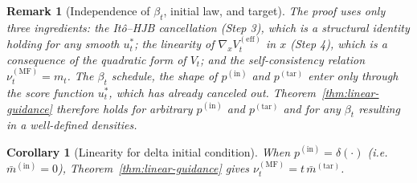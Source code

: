 \documentclass[11pt,onecolumn]{article}
\newcommand{\ptar}{p^{(\mathrm{tar})}}
\newcommand{\pin}{p^{(\mathrm{in})}}
\newcommand{\MF}{\mathrm{MF}}
\newcommand{\Veff}{V^{(\mathrm{eff})}}
\newtheorem{corollary}[theorem]{Corollary}
\newtheorem{remark}{Remark}[section]
\begin{document}
\begin{remark}[Independence of $\beta_t$, initial law, and target] The proof uses only three ingredients: the It\^o--HJB cancellation (Step 3), which is a structural identity holding for any smooth $u_t^*$; the linearity of $\nabla_x\Veff_t$ in $x$ (Step 4), which is a consequence of the quadratic form of $V_t$; and the self-consistency relation $\nu_t^{(\MF)} = m_t$. The $\beta_t$ schedule, the shape of $\pin$ and $\ptar$ enter only through the score function $u_t^*$, which has already canceled out. Theorem~\ref{thm:linear-guidance} therefore holds for arbitrary $\pin$ and $\ptar$  and for any  $\beta_t$ resulting in a well-defined densities.
\end{remark}

\begin{corollary}[Linearity for delta initial condition]
\label{cor:delta-IC}
When $\pin = \delta(\cdot)$ (i.e.\ $\bar m^{(\mathrm{in})}=0$),
Theorem~\ref{thm:linear-guidance} gives
$\nu_t^{(\MF)} = t\,\bar m^{(\mathrm{tar})}$.
\end{corollary}
\end{document}
